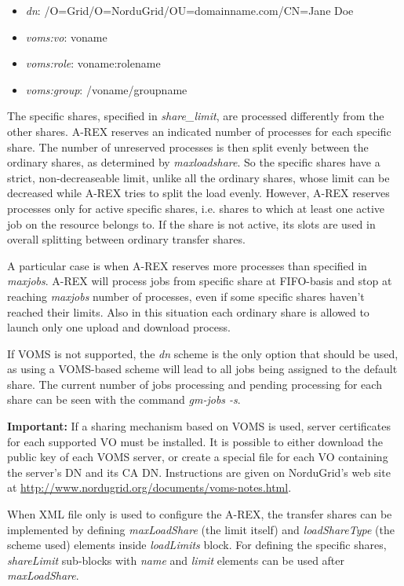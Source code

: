 \documentclass{article}                            %
\begin{document}
\begin{itemize}
\item \emph{dn}: /O=Grid/O=NorduGrid/OU=domainname.com/CN=Jane Doe
\item \emph{voms:vo}: voname
\item \emph{voms:role}: voname:rolename
\item \emph{voms:group}: /voname/groupname
\end{itemize}

The specific shares, specified in \emph{share\_limit}, are processed
differently from the other shares. A-REX reserves an indicated number of 
processes for each specific share. The number of unreserved processes is then
split evenly between the ordinary shares, as determined by \emph{maxloadshare}. 
So the specific shares have a strict, non-decreaseable limit, unlike all the 
ordinary shares, whose limit can be decreased while A-REX tries to split the 
load evenly. However, A-REX reserves processes only for active 
specific shares, i.e. shares to which at least one active job on the resource 
belongs to. If the share is not active, its slots are used in overall splitting
between ordinary transfer shares.

A particular case is when A-REX reserves more processes than specified in
\emph{maxjobs}. A-REX will process jobs from specific share at FIFO-basis and
stop at reaching \emph{maxjobs} number of processes, even if some specific
shares haven't reached their limits. Also in this situation each ordinary
share is allowed to launch only one upload and download process.

If VOMS is not supported, the \emph{dn} scheme is the only option that
should be used, as using a VOMS-based scheme will lead to all jobs
being assigned to the default share. The current number of jobs
processing and pending processing for each share can be seen with the
command \emph{gm-jobs -s}.

\textbf{Important:} If a sharing mechanism based on VOMS is used,
server certificates for each supported VO must be installed. It is
possible to either download the public key of each VOMS server, or
create a special file for each VO containing the server's DN and its
CA DN. Instructions are given on NorduGrid's web site at
\url{http://www.nordugrid.org/documents/voms-notes.html}.

When XML file only is used to configure the A-REX, the transfer shares
can be implemented by defining \emph{maxLoadShare} (the limit itself)
and \emph{loadShareType} (the scheme used) elements inside 
\emph{loadLimits} block. For defining the specific shares, \emph{shareLimit}
sub-blocks with \emph{name} and \emph{limit} elements can be used after 
\emph{maxLoadShare}.
\end{document}

